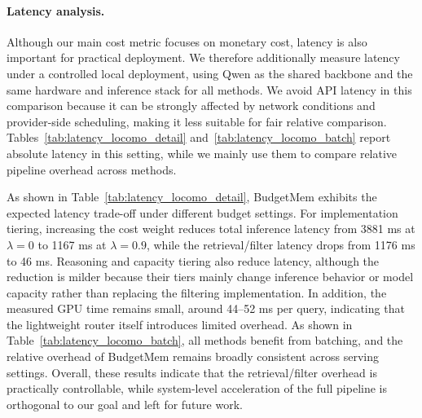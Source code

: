 \paragraph{Latency analysis.}
Although our main cost metric focuses on monetary cost, latency is also important for practical deployment. We therefore additionally measure latency under a controlled local deployment, using Qwen as the shared backbone and the same hardware and inference stack for all methods. We avoid API latency in this comparison because it can be strongly affected by network conditions and provider-side scheduling, making it less suitable for fair relative comparison. Tables~\ref{tab:latency_locomo_detail} and~\ref{tab:latency_locomo_batch} report absolute latency in this setting, while we mainly use them to compare relative pipeline overhead across methods.

As shown in Table~\ref{tab:latency_locomo_detail}, BudgetMem exhibits the expected latency trade-off under different budget settings. For implementation tiering, increasing the cost weight reduces total inference latency from 3881 ms at $\lambda=0$ to 1167 ms at $\lambda=0.9$, while the retrieval/filter latency drops from 1176 ms to 46 ms. Reasoning and capacity tiering also reduce latency, although the reduction is milder because their tiers mainly change inference behavior or model capacity rather than replacing the filtering implementation. In addition, the measured GPU time remains small, around 44--52 ms per query, indicating that the lightweight router itself introduces limited overhead. As shown in Table~\ref{tab:latency_locomo_batch}, all methods benefit from batching, and the relative overhead of BudgetMem remains broadly consistent across serving settings. Overall, these results indicate that the retrieval/filter overhead is practically controllable, while system-level acceleration of the full pipeline is orthogonal to our goal and left for future work.


